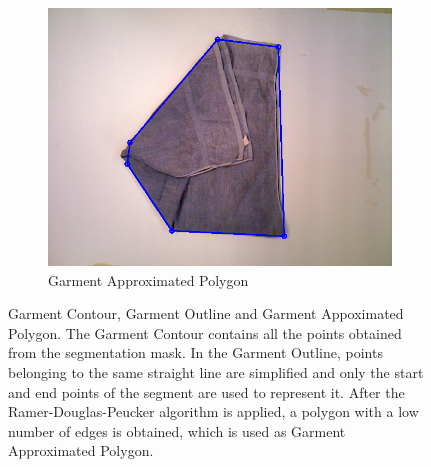 \begin{figure}[htbp]
\begin{subfigure}[r]{0.49\textwidth}
    	\includegraphics[width=\textwidth]
    	{figures/polygon-approx-01.png}
    	\caption{Garment Approximated Polygon}
	\end{subfigure} 
    \caption[Garment Contour, Garment Outline and Garment Appoximated Polygon.]
    {Garment Contour, Garment Outline and Garment Appoximated Polygon. The Garment Contour contains all the points obtained from the segmentation mask. In the Garment Outline, points belonging to the same straight line are simplified and only the start and end points of the segment are used to represent it. After the Ramer-Douglas-Peucker algorithm is applied, a polygon with a low number of edges is obtained, which is used as Garment Approximated Polygon. }
    \label{fig:contour_and_simplified_contour}
\end{figure}
